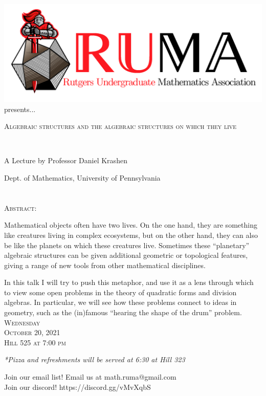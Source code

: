 \documentclass[12pt]{article}
\begin{document}

\begin{center}\includegraphics[scale=.40]{RUMAlogo.png}\\
presents... \\
\begin{spacing}{1.5}
{\fontsize{36}{36}\selectfont  \textsc{
Algebraic structures and the algebraic structures on which they
live}} \end{spacing}
 

~~\\
\begin{spacing}{1.5}
{\fontsize{24}{24} \selectfont A Lecture by Professor Daniel Krashen}  \end{spacing}
\large Dept. of Mathematics, University of Pennsylvania \\~~\\
~~\\

\normalsize
\textsc{Abstract:}

\large
Mathematical objects often have two lives. On the one
hand, they are something like creatures living in complex
ecosystems, but on the other hand, they can also be like the
planets on which these creatures live. Sometimes these
``planetary'' algebraic structures can be given additional
geometric or topological features, giving a range of new tools
from other mathematical disciplines. 

In this talk I will try to push this metaphor, and use it as a
lens through which to view some open problems in the theory of
quadratic forms and division algebras. In particular, we will see
how these problems connect to ideas in geometry, such as the
(in)famous ``hearing the shape of the drum'' problem.
\\

\vspace{5mm} 
\huge   \textsc{Wednesday\\October 20, 2021 \\Hill 525 at 7:00
  pm}

\vspace{2mm}
\large
\emph{*Pizza and refreshments will be served at 6:30 at Hill 323}
\end{center}

\begin{center}
  \large  Join our email list! Email us at
  math.ruma@gmail.com\\Join our discord!
  https://discord.gg/vMvXqbS
\end{center}
\end{document}
